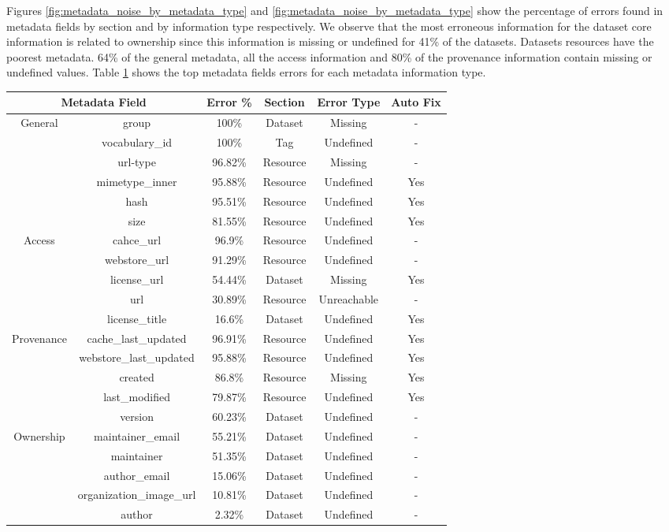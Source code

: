 \documentclass[runningheads,a4paper]{llncs}
\begin{document}
Figures \ref{fig:metadata_noise_by_metadata_type} and \ref{fig:metadata_noise_by_metadata_type} show the percentage of errors found in metadata fields by section and by information type respectively. We observe that the most erroneous information for the dataset core information is related to ownership since this information is missing or undefined for 41\% of the datasets. Datasets resources have the poorest metadata. 64\% of the general metadata, all the access information and 80\% of the provenance information contain missing or undefined values. Table \ref{tab:top_metadata_fields_errors} shows the top metadata fields errors for each metadata information type.

\begin{table}
\begin{center}
\begin{tabular}{|c|c|c|c|c|c|}
\hline
\multicolumn{2}{|c|}{Metadata Field} & Error \% & Section & Error Type & Auto Fix\tabularnewline
\hline
\hline
\multirow{6}{*}{General } & group & 100\% & Dataset & Missing & -\tabularnewline
\cline{2-6}
 & vocabulary\_id & 100\% & Tag & Undefined & -\tabularnewline
\cline{2-6}
 & url-type & 96.82\% & Resource & Missing & -\tabularnewline
\cline{2-6}
 & mimetype\_inner & 95.88\% & Resource & Undefined & Yes\tabularnewline
\cline{2-6}
 & hash & 95.51\% & Resource & Undefined & Yes\tabularnewline
\cline{2-6}
 & size & 81.55\% & Resource & Undefined & Yes\tabularnewline
\hline
\multirow{5}{*}{Access } & cahce\_url & 96.9\% & Resource & Undefined & -\tabularnewline
\cline{2-6}
 & webstore\_url & 91.29\% & Resource & Undefined & -\tabularnewline
\cline{2-6}
 & license\_url & 54.44\% & Dataset & Missing & Yes\tabularnewline
\cline{2-6}
 & url & 30.89\% & Resource & Unreachable & -\tabularnewline
\cline{2-6}
 & license\_title & 16.6\% & Dataset & Undefined & Yes\tabularnewline
\hline
\multirow{5}{*}{Provenance } & cache\_last\_updated & 96.91\% & Resource & Undefined & Yes\tabularnewline
\cline{2-6}
 & webstore\_last\_updated & 95.88\% & Resource & Undefined & Yes\tabularnewline
\cline{2-6}
 & created & 86.8\% & Resource & Missing & Yes\tabularnewline
\cline{2-6}
 & last\_modified & 79.87\% & Resource & Undefined & Yes\tabularnewline
\cline{2-6}
 & version & 60.23\% & Dataset & Undefined & -\tabularnewline
\hline
\multirow{5}{*}{Ownership } & maintainer\_email & 55.21\% & Dataset & Undefined & -\tabularnewline
\cline{2-6}
 & maintainer & 51.35\% & Dataset & Undefined & -\tabularnewline
\cline{2-6}
 & author\_email & 15.06\% & Dataset & Undefined & -\tabularnewline
\cline{2-6}
 & organization\_image\_url & 10.81\% & Dataset & Undefined & -\tabularnewline
\cline{2-6}
 & author & 2.32\% & Dataset & Undefined & -\tabularnewline
\hline
\end{tabular}
\label{tab:top_metadata_fields_errors}
\end{center}
\end{table}
\end{document}

